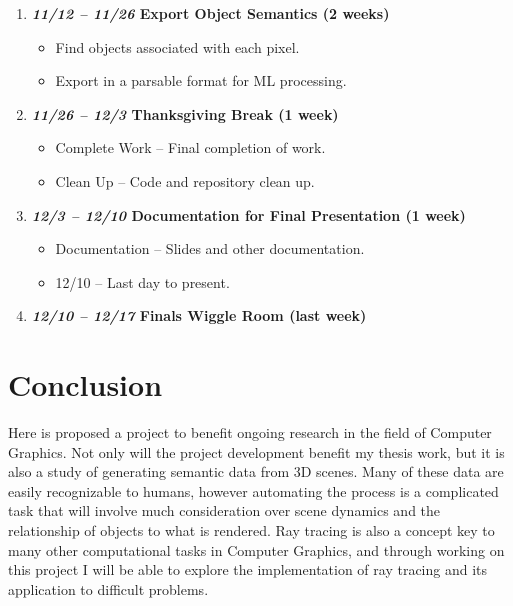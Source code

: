 \documentclass[conference]{IEEEtran}
\begin{document}
\begin{enumerate}
\begin{itemize}
\end{itemize}
\item \textbf{\textit{11/12 -- 11/26} Export Object Semantics (2 weeks)}
\begin{itemize}
\item Find objects associated with each pixel.
\item Export in a parsable format for ML processing.
\end{itemize}
\item \textbf{\textit{11/26 -- 12/3} Thanksgiving Break (1 week)}
\begin{itemize}
\item Complete Work -- Final completion of work.
\item Clean Up -- Code and repository clean up.
\end{itemize}
\item \textbf{\textit{12/3 -- 12/10} Documentation for Final Presentation (1 week)}
\begin{itemize}
\item Documentation -- Slides and other documentation.
\item 12/10 -- Last day to present.
\end{itemize}
\item \textbf{\textit{12/10 -- 12/17} Finals Wiggle Room (last week)}
\end{enumerate}

\section{Conclusion}
\label{sec:conclusion}
Here is proposed a project to benefit ongoing research in the field of Computer Graphics.
Not only will the project development benefit my thesis work, but it is also a study of
generating semantic data from 3D scenes. Many of these data are easily recognizable to humans,
however automating the process is a complicated task that will involve much consideration over
scene dynamics and the relationship of objects to what is rendered. Ray tracing is also a concept
key to many other computational tasks in Computer Graphics, and through working on this
project I will be able to explore the implementation of ray tracing and its application
to difficult problems.




\end{document}
